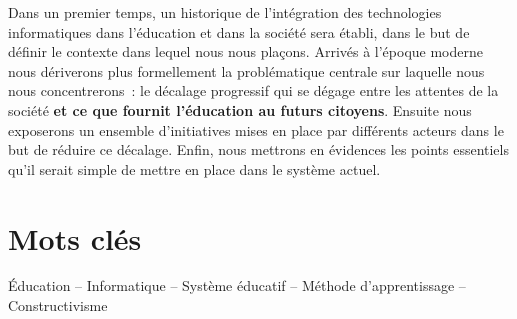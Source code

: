 Dans un premier temps, un historique de l'intégration des technologies informatiques dans l'éducation et dans la société sera établi, dans le but de définir le contexte dans lequel nous nous plaçons. Arrivés à l'époque moderne nous dériverons plus formellement la problématique centrale sur laquelle nous nous concentrerons~: le décalage progressif qui se dégage entre les attentes de la société \textbf{et ce que fournit l'éducation au futurs citoyens}. Ensuite nous exposerons un ensemble d'initiatives mises en place par différents acteurs dans le but de réduire ce décalage. Enfin, nous mettrons en évidences les points essentiels qu'il serait simple de mettre en place dans le système actuel.

\vfill
\section*{Mots clés}
Éducation -- Informatique -- Système éducatif -- Méthode d'apprentissage -- Constructivisme